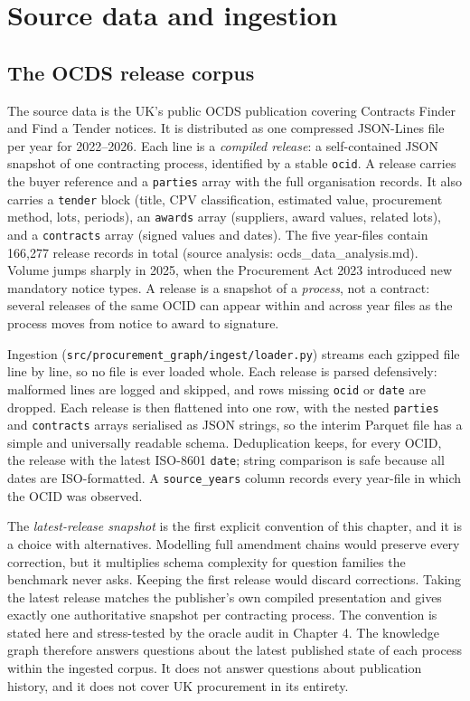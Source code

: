 \documentclass[10pt]{article} %
\begin{document}
\section{Source data and ingestion}\label{sec:source-data-and-ingestion}

\subsection{The OCDS release corpus}\label{sec:the-ocds-release-corpus}

The source data is the UK's public OCDS publication covering Contracts Finder and Find a Tender notices. It is distributed as one compressed JSON-Lines file per year for 2022--2026. Each line is a \emph{compiled release}: a self-contained JSON snapshot of one contracting process, identified by a stable \texttt{ocid}. A release carries the buyer reference and a \texttt{parties} array with the full organisation records. It also carries a \texttt{tender} block (title, CPV classification, estimated value, procurement method, lots, periods), an \texttt{awards} array (suppliers, award values, related lots), and a \texttt{contracts} array (signed values and dates). The five year-files contain 166,277 release records in total (source analysis: ocds\_data\_analysis.md). Volume jumps sharply in 2025, when the Procurement Act 2023 introduced new mandatory notice types. A release is a snapshot of a \emph{process}, not a contract: several releases of the same OCID can appear within and across year files as the process moves from notice to award to signature.

Ingestion (\texttt{src/procurement\_graph/ingest/loader.py}) streams each gzipped file line by line, so no file is ever loaded whole. Each release is parsed defensively: malformed lines are logged and skipped, and rows missing \texttt{ocid} or \texttt{date} are dropped. Each release is then flattened into one row, with the nested \texttt{parties} and \texttt{contracts} arrays serialised as JSON strings, so the interim Parquet file has a simple and universally readable schema. Deduplication keeps, for every OCID, the release with the latest ISO-8601 \texttt{date}; string comparison is safe because all dates are ISO-formatted. A \texttt{source\_years} column records every year-file in which the OCID was observed.

The \emph{latest-release snapshot} is the first explicit convention of this chapter, and it is a choice with alternatives. Modelling full amendment chains would preserve every correction, but it multiplies schema complexity for question families the benchmark never asks. Keeping the first release would discard corrections. Taking the latest release matches the publisher's own compiled presentation and gives exactly one authoritative snapshot per contracting process. The convention is stated here and stress-tested by the oracle audit in Chapter 4. The knowledge graph therefore answers questions about the latest published state of each process within the ingested corpus. It does not answer questions about publication history, and it does not cover UK procurement in its entirety.
\end{document}
